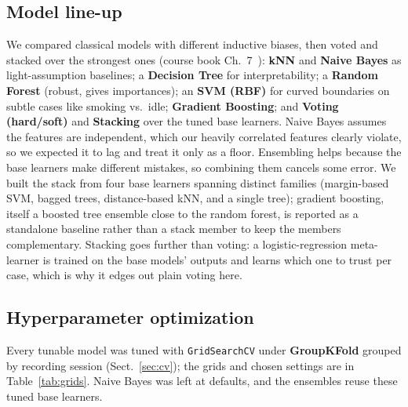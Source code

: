\documentclass[runningheads]{llncs}
\begin{document}
\subsection{Model line-up}
We compared classical models with different inductive biases, then voted and stacked over the strongest ones (course book Ch.~7~\cite{hoogendoorn2018}): \textbf{kNN} and \textbf{Naive Bayes} as light-assumption baselines; a \textbf{Decision Tree} for interpretability; a \textbf{Random Forest} (robust, gives importances); an \textbf{SVM (RBF)} for curved boundaries on subtle cases like smoking vs.\ idle; \textbf{Gradient Boosting}; and \textbf{Voting (hard/soft)} and \textbf{Stacking} over the tuned base learners. Naive Bayes assumes the features are independent, which our heavily correlated features clearly violate, so we expected it to lag and treat it only as a floor. Ensembling helps because the base learners make different mistakes, so combining them cancels some error. We built the stack from four base learners spanning distinct families (margin-based SVM, bagged trees, distance-based kNN, and a single tree); gradient boosting, itself a boosted tree ensemble close to the random forest, is reported as a standalone baseline rather than a stack member to keep the members complementary. Stacking goes further than voting: a logistic-regression meta-learner is trained on the base models' outputs and learns which one to trust per case, which is why it edges out plain voting here.

\subsection{Hyperparameter optimization}
Every tunable model was tuned with \texttt{GridSearchCV} under \textbf{GroupKFold} grouped by recording session (Sect.~\ref{sec:cv}); the grids and chosen settings are in Table~\ref{tab:grids}. Naive Bayes was left at defaults, and the ensembles reuse these tuned base learners.
\end{document}
